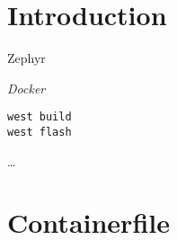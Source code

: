 



\puttitle{}

\section{Introduction}

Zephyr \zephyrversion{}

\emph{Docker}


\begin{lstlisting}
west build
west flash
\end{lstlisting}

\begin{infobox}
 \dots
\end{infobox}

\newpage

\appendix

\section{Containerfile}\label{containerfile}





